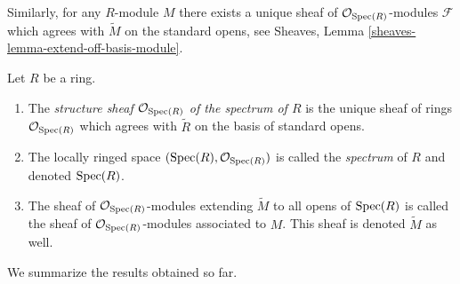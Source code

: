 \medskip\noindent
Similarly, for any $R$-module $M$ there exists
a unique sheaf of $\mathcal{O}_{\mathop{\mathrm{Spec}}(R)}$-modules
$\mathcal{F}$ which agrees with $\widetilde M$ on the
standard opens, see
Sheaves, Lemma \ref{sheaves-lemma-extend-off-basis-module}.

\begin{definition}
\label{definition-structure-sheaf}
Let $R$ be a ring.
\begin{enumerate}
\item The {\it structure sheaf $\mathcal{O}_{\mathop{\mathrm{Spec}}(R)}$ of the
spectrum of $R$} is the unique sheaf of rings $\mathcal{O}_{\mathop{\mathrm{Spec}}(R)}$
which agrees with $\widetilde R$ on the basis of standard opens.
\item The locally ringed space
$(\mathop{\mathrm{Spec}}(R), \mathcal{O}_{\mathop{\mathrm{Spec}}(R)})$ is called
the {\it spectrum} of $R$ and denoted $\mathop{\mathrm{Spec}}(R)$.
\item The sheaf of $\mathcal{O}_{\mathop{\mathrm{Spec}}(R)}$-modules
extending $\widetilde M$ to all opens of $\mathop{\mathrm{Spec}}(R)$
is called the sheaf of $\mathcal{O}_{\mathop{\mathrm{Spec}}(R)}$-modules
associated to $M$. This sheaf is denoted $\widetilde M$ as
well.
\end{enumerate}
\end{definition}

\noindent
We summarize the results obtained so far.

